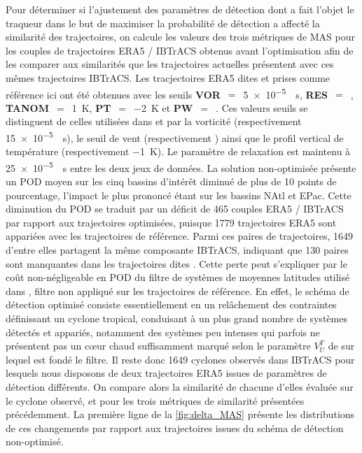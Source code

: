 \documentclass[../main.tex]{subfiles}
\begin{document}
Pour déterminer si l'ajustement des paramètres de détection dont a fait l'objet le traqueur dans le but de maximiser la probabilité de détection a affecté la
similarité des trajectoires, on calcule les valeurs des trois métriques de MAS pour les couples de trajectoires ERA5 / IBTrACS obtenus avant l'optimisation afin
de les comparer aux similarités que les trajectoires actuelles présentent avec ces mêmes trajectoires IBTrACS. Les tracjectoires ERA5 dites
 et prises comme référence ici ont été obtenues avec les seuils \textbf{VOR}~$=$~\SI{5e-5}{\per\second}, \textbf{RES}~$=$~,
\textbf{TANOM}~$=$~\SI{1}{\kelvin}, \textbf{PT}~$=$~\SI{-2}{\kelvin} et \textbf{PW}~$=$~. Ces valeurs seuils se distinguent de celles utilisées dans
\cite{dulac_assessing_2023} et \cite{bourdin_intercomparison_2022} par la vorticité (respectivement \SI{15e-5}{\per\second}), le seuil de vent (respectivement
) ainsi que le profil vertical de température (respectivement \SI{-1}{\kelvin}). Le paramètre de relaxation est maintenu à \SI{25e-5}{\per\second} entre
les deux jeux de données. La solution non-optimisée présente un POD moyen sur les cinq bassins d'intérêt diminué de plus de \num{10} points de pourcentage,
l'impact le plus prononcé étant sur les bassins NAtl et EPac. Cette diminution du POD se traduit par un déficit de \num{465} couples ERA5 / IBTrACS par rapport
aux trajectoires optimisées, puisque \num{1779} trajectoires ERA5 sont appariées avec les trajectoires de référence. Parmi ces paires de trajectoires,
\num{1649} d'entre elles partagent la même composante IBTrACS, indiquant que \num{130} paires sont manquantes dans les trajectoires dites
. Cette perte peut s'expliquer par le coût non-négligeable en POD du filtre de systèmes de moyennes latitudes utilisé dans
\cite{dulac_assessing_2023}, filtre non appliqué sur les trajectoires de référence. En effet, le schéma de détection optimisé consiste essentiellement en un
relâchement des contraintes définissant un cyclone tropical, conduisant à un plus grand nombre de systèmes détectés et appariés, notamment des systèmes peu
intenses qui parfois ne présentent pas un cœur chaud suffisamment marqué selon le paramètre $V_U^T$ de \cite{hart_cyclone_2003} sur lequel est fondé le filtre.
Il reste donc \num{1649} cyclones observés dans IBTrACS pour lesquels nous disposons de deux trajectoires ERA5 issues de paramètres de détection différents.
On compare alors la similarité de chacune d'elles évaluée sur le cyclone observé, et pour les trois métriques de similarité présentées précédemment. La première
ligne de la \cref{fig:delta_MAS} présente les distributions de ces changements par rapport aux trajectoires issues du schéma de détection non-optimisé.
\end{document}
